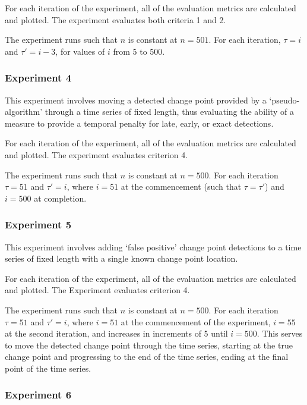 \documentclass{uvamscse}	%
\begin{document}
For each iteration of the experiment, all of the evaluation metrics are calculated and plotted. The experiment evaluates both criteria 1 and 2.

The experiment runs such that $n$ is constant at $n=501$. For each iteration, $\tau = i$ and $\tau' = i - 3$, for values of $i$ from 5 to 500.


\subsubsection{Experiment 4}

This experiment involves moving a detected change point provided by a `pseudo-algorithm' through a time series of fixed length, thus evaluating the ability of a measure to provide a temporal penalty for late, early, or exact detections.

For each iteration of the experiment, all of the evaluation metrics are calculated and plotted. The experiment evaluates criterion 4.

The experiment runs such that $n$ is constant at $n=500$. For each iteration $\tau = 51$ and $\tau' = i$, where $i = 51$ at the commencement (such that $\tau = \tau'$) and $i = 500$ at completion.



\subsubsection{Experiment 5}

This experiment involves adding `false positive' change point detections to a time series of fixed length with a single known change point location.

For each iteration of the experiment, all of the evaluation metrics are calculated and plotted. The Experiment evaluates criterion 4.

The experiment runs such that $n$ is constant at $n=500$. For each iteration $\tau = 51$ and $\tau' = i$, where $i = 51$ at the commencement of the experiment, $i=55$ at the second iteration, and increases in increments of 5 until $i = 500$. This serves to move the detected change point through the time series, starting at the true change point and progressing to the end of the time series, ending at the final point of the time series.



\subsubsection{Experiment 6}
\end{document}
